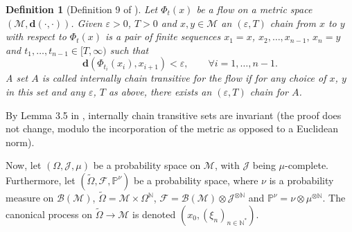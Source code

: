 \documentclass{article}
\newtheorem{definition}{Definition}
\newcommand{\CM}{\mathcal{M}}
\newcommand{\BN}{\mathbb{N}}
\newcommand{\bd}{\mathbf{d}}
\begin{document}

\begin{definition}[Definition 9 of \cite{shah2021stochastic}]
    Let $\Phi_t(x)$ be a flow on a metric space $(\CM,\bd(\cdot,\cdot))$. Given $\varepsilon>0$, $T>0$ and $x,y\in\CM$ an $(\varepsilon,T)$ chain from $x$ to $y$ with respect to $\Phi_t(x)$ is a pair of finite sequences $x_1=x$, $x_2,\dots, x_{n-1},\, x_n=y$ and $t_1,\dots,t_{n-1}\in[T,\infty)$ such that 
    \begin{equation}
        \bd(\Phi_{t_i}(x_i),x_{i+1})<\varepsilon,\qquad \forall i=1,\dots,n-1.
    \end{equation}
    A set $A$ is called internally chain transitive for the flow if for any choice of $x$, $y$ in this set and any $\varepsilon$, $T$ as above, there exists an $(\varepsilon,T)$ chain for $A$. 
\end{definition}

By Lemma 3.5 in \cite{benaim2005stochastic}, internally chain transitive sets are invariant (the proof does not change, modulo the incorporation of the metric as opposed to a Euclidean norm). 



Now, let $(\Omega,\mathcal{J}, \mu)$ be a probability space on $\CM$, with $\mathcal{J}$ being $\mu$-complete. Furthermore, let $(\tilde\Omega,\mathcal{F}, \mathbb{P}^\nu)$ be a probability space, where $\nu$ is a probability measure on $\mathcal{B}(\CM)$, $\tilde\Omega=\CM\times \Omega^{\BN}$, $\mathcal{F}=\mathcal{B}(\CM)\otimes \mathcal{J}^{\otimes \BN}$ and $\mathbb{P}^\nu=\nu\otimes\mu^{\otimes\BN}$. The canonical process on $\tilde\Omega\to\CM$ is denoted $(x_0,(\xi_n)_{n\in\BN^*})$.
\end{document}
